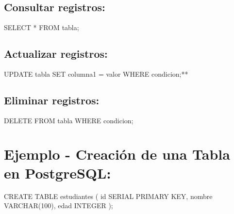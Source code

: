\documentclass[
  a4paper,
  onepage,
  openany]{scrreprt}
\newenvironment{Shaded}{\begin{snugshade}}{\end{snugshade}}
\newcommand{\DataTypeTok}[1]{\textcolor[rgb]{0.68,0.00,0.00}{#1}}
\newcommand{\DecValTok}[1]{\textcolor[rgb]{0.68,0.00,0.00}{#1}}
\newcommand{\KeywordTok}[1]{\textcolor[rgb]{0.00,0.23,0.31}{#1}}
\newcommand{\NormalTok}[1]{\textcolor[rgb]{0.00,0.23,0.31}{#1}}
\newcommand{\OperatorTok}[1]{\textcolor[rgb]{0.37,0.37,0.37}{#1}}
\begin{document}
\hypertarget{consultar-registros}{%
\subsection{Consultar registros:}\label{consultar-registros}}

\begin{Shaded}
\begin{Highlighting}[]
\KeywordTok{SELECT} \OperatorTok{*} \KeywordTok{FROM}\NormalTok{ tabla;}
\end{Highlighting}
\end{Shaded}

\hypertarget{actualizar-registros}{%
\subsection{Actualizar registros:}\label{actualizar-registros}}

\begin{Shaded}
\begin{Highlighting}[]
\KeywordTok{UPDATE}\NormalTok{ tabla }\KeywordTok{SET}\NormalTok{ columna1 }\OperatorTok{=}\NormalTok{ valor }\KeywordTok{WHERE}\NormalTok{ condicion;}\OperatorTok{**}
\end{Highlighting}
\end{Shaded}

\hypertarget{eliminar-registros}{%
\subsection{Eliminar registros:}\label{eliminar-registros}}

\begin{Shaded}
\begin{Highlighting}[]
\KeywordTok{DELETE} \KeywordTok{FROM}\NormalTok{ tabla }\KeywordTok{WHERE}\NormalTok{ condicion;}
\end{Highlighting}
\end{Shaded}

\hypertarget{ejemplo---creaciuxf3n-de-una-tabla-en-postgresql}{%
\section{Ejemplo - Creación de una Tabla en
PostgreSQL:}\label{ejemplo---creaciuxf3n-de-una-tabla-en-postgresql}}

\begin{Shaded}
\begin{Highlighting}[]
\KeywordTok{CREATE} \KeywordTok{TABLE}\NormalTok{ estudiantes (}
    \KeywordTok{id}\NormalTok{ SERIAL }\KeywordTok{PRIMARY} \KeywordTok{KEY}\NormalTok{,}
\NormalTok{    nombre }\DataTypeTok{VARCHAR}\NormalTok{(}\DecValTok{100}\NormalTok{),}
\NormalTok{    edad }\DataTypeTok{INTEGER}
\NormalTok{);}
\end{Highlighting}
\end{Shaded}
\end{document}
